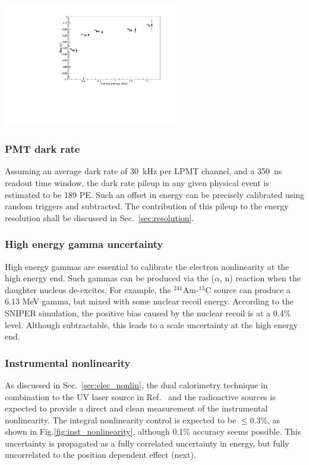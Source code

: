 \documentclass[a4paper,10pt,twoside]{cpc-hepnp}
\begin{document}
\begin{CJK*}{GB}{gbsn}
\begin{multicols}{2}
\begin{center}
  \centering
  \includegraphics[width=3in]{Bias_Compton.pdf}
  \label{compton}
\end{center}

\subsubsection{PMT dark rate}
\label{sec:dark_rate}
Assuming an average dark rate of 30~kHz per LPMT channel, and a 350~ns
readout time window, the dark rate pileup in any given physical event
is estimated to be 189 PE.
Such an offset in energy can be precisely calibrated using random triggers and
subtracted. The contribution of this pileup to the energy resolution
shall be discussed in Sec.~{\ref{sec:resolution}}.

\subsubsection{High energy gamma uncertainty}
\label{sec:uncer_highE}
High energy gammas are essential to calibrate the electron
nonlinearity at the high energy end. Such gammas can be produced via
the ($\alpha$, n) reaction when the daughter nucleus de-excites. For
example, the $^{241}$Am-$^{13}$C source can produce a 6.13 MeV gamma,
but mixed with some nuclear recoil energy. According to the SNIPER
simulation, the positive bias caused by the nuclear recoil is at a
0.4\% level. Although subtractable, this leads to a scale uncertainty
at the high energy end.

\subsubsection{Instrumental nonlinearity}
  As discussed in Sec.~\ref{sec:elec_nonlin}, the dual
  calorimetry technique in combination to the UV laser source in
  Ref.~\cite{zhangyuanyuanpaper} and the radioactive sources is
  expected to provide a direct and clean measurement of the
  instrumental nonlinearity.  The integral nonlinearity control is
  expected to be $\leq$0.3\%, as shown in
  Fig.\ref{fig:inst_nonlinearity}, although 0.1\% accuracy seems
  possible.  This uncertainty is propagated as a fully correlated
  uncertainty in energy, but fully uncorrelated to the position
  dependent effect (next). 


\end{multicols}
\end{CJK*}
\end{document}
